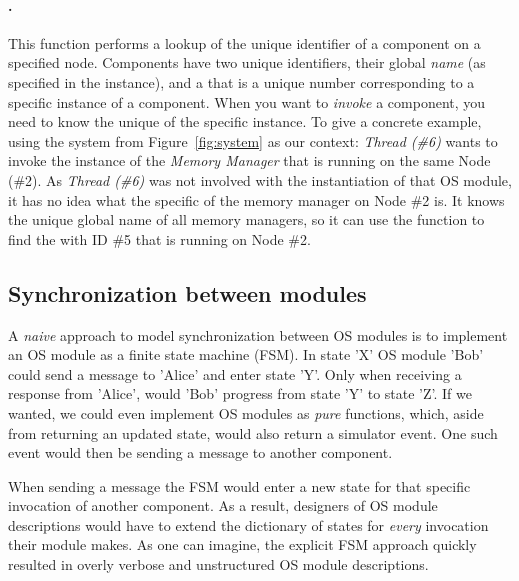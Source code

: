 \paragraph{.}
This function performs a lookup of the unique identifier of a component on a specified node.
Components have two unique identifiers, their global \emph{name} (as specified in the  instance), and a  that is a unique number corresponding to a specific instance of a component.
When you want to \emph{invoke} a component, you need to know the unique  of the specific instance.
To give a concrete example, using the system from Figure~\ref{fig:system} as our context: \emph{Thread (\#6)} wants to invoke the instance of the \emph{Memory Manager} that is running on the same Node (\#2).
As \emph{Thread (\#6)} was not involved with the instantiation of that OS module, it has no idea what the specific  of the memory manager on Node \#2 is.
It knows the unique global name of all memory managers, so it can use the  function to find the  with ID \#5 that is running on Node \#2.

\subsection{Synchronization between modules}
A \emph{naive} approach to model synchronization between OS modules is to implement an OS module as a finite state machine (FSM).
In state 'X' OS module 'Bob' could send a message to 'Alice' and enter state 'Y'.
Only when receiving a response from 'Alice', would 'Bob' progress from state 'Y' to state 'Z'.
If we wanted, we could even implement OS modules as \emph{pure} functions, which, aside from returning an updated state, would also return a simulator event.
One such event would then be sending a message to another component.

When sending a message the FSM would enter a new state for that specific invocation of another component.
As a result, designers of OS module descriptions would have to extend the dictionary of states for \emph{every} invocation their module makes.
As one can imagine, the explicit FSM approach quickly resulted in overly verbose and unstructured OS module descriptions.


